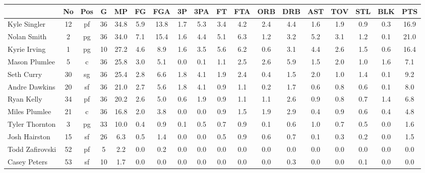 \documentclass[10pt,letterpaper]{article}
\begin{document}
\begin{table}[ht]
\begin{center}
\begin{tabular}{lccccccccccccccccc}
  \hline
 & No & Pos & G & MP & FG & FGA & 3P & 3PA & FT & FTA & ORB & DRB & AST & TOV & STL & BLK & PTS \\ 
  \hline
Kyle Singler & 12 & pf & 36 & 34.8 & 5.9 & 13.8 & 1.7 & 5.3 & 3.4 & 4.2 & 2.4 & 4.4 & 1.6 & 1.9 & 0.9 & 0.3 & 16.9 \\ 
  Nolan Smith & 2 & pg & 36 & 34.0 & 7.1 & 15.4 & 1.6 & 4.4 & 5.1 & 6.3 & 1.2 & 3.2 & 5.2 & 3.1 & 1.2 & 0.1 & 21.0 \\ 
  Kyrie Irving & 1 & pg & 10 & 27.2 & 4.6 & 8.9 & 1.6 & 3.5 & 5.6 & 6.2 & 0.6 & 3.1 & 4.4 & 2.6 & 1.5 & 0.6 & 16.4 \\ 
  Mason Plumlee & 5 & c & 36 & 25.8 & 3.0 & 5.1 & 0.0 & 0.1 & 1.1 & 2.5 & 2.6 & 5.9 & 1.5 & 2.0 & 1.0 & 1.6 & 7.1 \\ 
  Seth Curry & 30 & sg & 36 & 25.4 & 2.8 & 6.6 & 1.8 & 4.1 & 1.9 & 2.4 & 0.4 & 1.5 & 2.0 & 1.0 & 1.4 & 0.1 & 9.2 \\ 
  Andre Dawkins & 20 & sf & 36 & 21.0 & 2.7 & 5.6 & 1.8 & 4.1 & 0.9 & 1.1 & 0.2 & 1.7 & 0.6 & 0.8 & 0.6 & 0.1 & 8.0 \\ 
  Ryan Kelly & 34 & pf & 36 & 20.2 & 2.6 & 5.0 & 0.6 & 1.9 & 0.9 & 1.1 & 1.1 & 2.6 & 0.9 & 0.8 & 0.7 & 1.4 & 6.8 \\ 
  Miles Plumlee & 21 & c & 36 & 16.8 & 2.0 & 3.8 & 0.0 & 0.0 & 0.9 & 1.5 & 1.9 & 2.9 & 0.4 & 0.9 & 0.6 & 0.4 & 4.8 \\ 
  Tyler Thornton & 3 & pg & 33 & 10.0 & 0.4 & 0.9 & 0.1 & 0.5 & 0.7 & 0.9 & 0.1 & 0.6 & 1.0 & 0.7 & 0.5 & 0.0 & 1.6 \\ 
  Josh Hairston & 15 & sf & 26 & 6.3 & 0.5 & 1.4 & 0.0 & 0.0 & 0.5 & 0.9 & 0.6 & 0.7 & 0.1 & 0.3 & 0.2 & 0.0 & 1.5 \\ 
  Todd Zafirovski & 52 & pf & 5 & 2.2 & 0.0 & 0.2 & 0.0 & 0.0 & 0.0 & 0.0 & 0.0 & 0.0 & 0.0 & 0.0 & 0.0 & 0.0 & 0.0 \\ 
  Casey Peters & 53 & sf & 10 & 1.7 & 0.0 & 0.0 & 0.0 & 0.0 & 0.0 & 0.0 & 0.0 & 0.3 & 0.0 & 0.0 & 0.1 & 0.0 & 0.0 \\ 
   \hline
\end{tabular}
\end{center}
\end{table}
\end{document}
